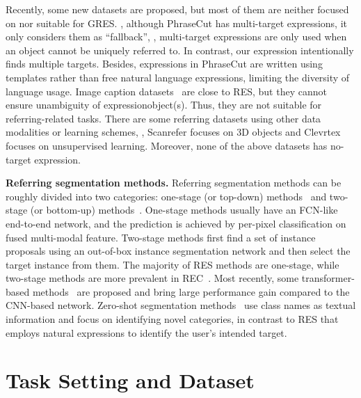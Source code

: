 \documentclass[10pt,twocolumn,letterpaper]{article}
\begin{document}
Recently, some new datasets are proposed, but most of them are neither focused on nor suitable for GRES. \Eg, although PhraseCut \cite{wu2020phrasecut} has multi-target expressions, it only considers them as ``fallback'', \ie, multi-target expressions are only used when an object cannot be uniquely referred to. In contrast, our expression intentionally finds multiple targets. Besides, expressions in PhraseCut are written using templates rather than free natural language expressions, limiting the diversity of language usage. Image caption datasets~\cite{plummer2015flickr30k,krishna2017visual} are close to RES, but they cannot ensure unambiguity of expressionobject(s).
Thus, they are not suitable for referring-related tasks. There are some referring datasets using other data modalities or learning schemes, \eg, Scanrefer \cite{chen2020scanrefer} focuses on 3D objects and Clevrtex \cite{karazija2021clevrtex} focuses on unsupervised learning. Moreover, none of the above datasets has no-target expression.


\textbf{Referring segmentation methods.} Referring segmentation methods can be roughly divided into two categories: one-stage (or top-down) methods~\cite{margffoy2018dynamic,zhang2022coupalign,li2018referring,chen2019see,ye2019cross,hu2020bi,huang2020referring,hui2020linguistic,luo2020cascade} and two-stage (or bottom-up) methods~\cite{yu2018mattnet,liu2022instance}. One-stage methods usually have an FCN-like \cite{long2015fully} end-to-end network, and the prediction is achieved by per-pixel classification on fused multi-modal feature. 
Two-stage methods first find a set of instance proposals using an out-of-box instance segmentation network and then select the target instance from them. The majority of RES methods are one-stage, while two-stage methods are more prevalent in REC~\cite{luo2017comprehension,hu2017modeling,hu2016natural,liu2017referring,yu2017joint,zhang2017discriminative}. Most recently, some transformer-based methods~\cite{VLTPAMI,MOSE,wang2022cris,M3Att,li2023transformer} are proposed and bring large performance gain compared to the CNN-based network. 
Zero-shot segmentation methods~\cite{FZShot3D,PAD,zhanghui2021} use class names as textual information and focus on identifying novel categories, in contrast to RES that employs natural expressions to identify the user's intended target.



\section{Task Setting and Dataset}
\end{document}
